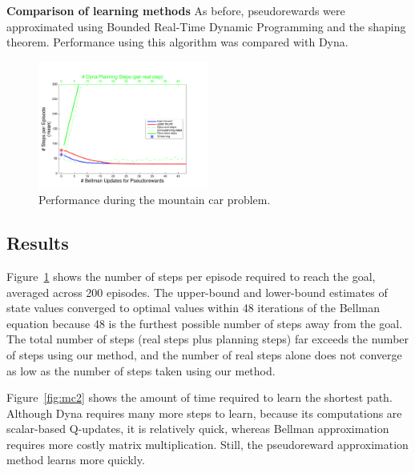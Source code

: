 \documentclass[letterpaper]{article}
\begin{document}
\noindent
\textbf{Comparison of learning methods} As before, pseudorewards were approximated using Bounded Real-Time Dynamic Programming and the shaping theorem. Performance using this algorithm was compared with Dyna.

\begin{figure}[H]
\centering
\includegraphics[width=0.5\textwidth]{MC_learning_vs_PRiterations_DYNA_mean}
\caption{Performance during the mountain car problem.}
\label{fig:mc1}
\end{figure}

\subsection{Results}

Figure~\ref{fig:mc1} shows the number of steps per episode required to reach the goal, averaged across 200 episodes. The upper-bound and lower-bound estimates of state values converged to optimal values within 48 iterations of the Bellman equation because 48 is the furthest possible number of steps away from the goal.
The total number of steps (real steps plus planning steps) far exceeds the number of steps using our method, and the number of real steps alone does not converge as low as the number of steps taken using our method.

Figure~\ref{fig:mc2} shows the amount of time required to learn the shortest path. Although Dyna requires many more steps to learn, because its computations are scalar-based Q-updates, it is relatively quick, whereas Bellman approximation requires more costly matrix multiplication. Still, the pseudoreward approximation method learns more quickly.
\end{document}
